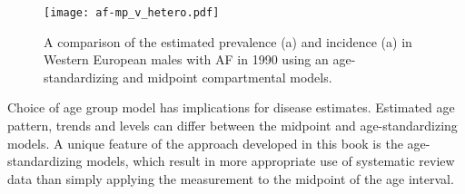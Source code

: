     \begin{figure}[h]
        \begin{center}
            \texttt{[image: af-mp\_v\_hetero.pdf]}
            \caption{A comparison of the estimated prevalence (a) and incidence
              (a) in Western European males with AF in 1990
              using an age-standardizing and midpoint compartmental models.}
            \label{fig:app-af compare}
        \end{center}
    \end{figure}

Choice of age group model has implications for disease estimates.
Estimated age pattern, trends and levels can differ between the
midpoint and age-standardizing models.  A unique feature of the
approach developed in this book is the age-standardizing models, which
result in more appropriate use of systematic review data than simply
applying the measurement to the midpoint of the age interval.
